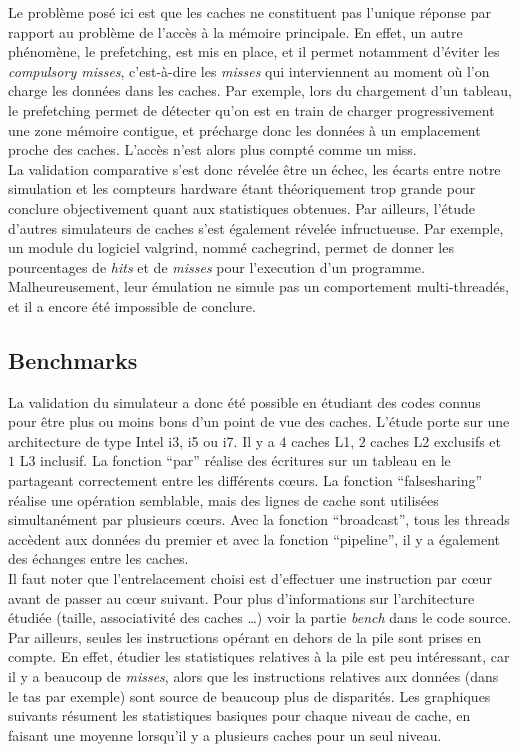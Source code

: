 Le problème posé ici est que les caches ne constituent pas l'unique réponse par rapport au problème de l'accès à la mémoire principale. En effet, un autre phénomène, le prefetching, est mis en place, et il permet notamment d'éviter les \emph{compulsory misses}, c'est-à-dire les \emph{misses} qui interviennent au moment où l'on charge les données dans les caches. Par exemple, lors du chargement d'un tableau, le prefetching permet de détecter qu'on est en train de charger progressivement une zone mémoire contigue, et précharge donc les données à un emplacement proche des caches. L'accès n'est alors plus compté comme un miss. \\

La validation comparative s'est donc révelée être un échec, les écarts entre notre simulation et les compteurs hardware étant théoriquement trop grande pour conclure objectivement quant aux statistiques obtenues. Par ailleurs, l'étude d'autres simulateurs de caches s'est également révelée infructueuse. Par exemple, un module du logiciel valgrind, nommé cachegrind, permet de donner les pourcentages de \emph{hits} et de \emph{misses} pour l'execution d'un programme. Malheureusement, leur émulation ne simule pas un comportement multi-threadés, et il a encore été impossible de conclure.
 
\subsection{Benchmarks}
La validation du simulateur a donc été possible en étudiant des codes connus pour être plus ou moins bons d'un point de vue des caches. L'étude porte sur une architecture de type \textsf{Intel} i3, i5 ou i7. Il y a $4$ caches L1, $2$ caches L2 exclusifs et $1$ L3 inclusif. La fonction ``par'' réalise des écritures sur un tableau en le partageant correctement entre les différents c{\oe}urs. La fonction ``falsesharing'' réalise une opération semblable, mais des lignes de cache sont utilisées simultanément par plusieurs c{\oe}urs. Avec la fonction ``broadcast'', tous les threads accèdent aux données du premier et avec la fonction ``pipeline'', il y a également des échanges entre les caches. \\

Il faut noter que l'entrelacement choisi est d'effectuer une instruction par c{\oe}ur avant de passer au c{\oe}ur suivant. Pour plus d'informations sur l'architecture étudiée (taille, associativité des caches \dots) voir la partie \emph{bench} dans le code source. Par ailleurs, seules les instructions opérant en dehors de la pile sont prises en compte. En effet, étudier les statistiques relatives à la pile est peu intéressant, car il y a beaucoup de \emph{misses}, alors que les instructions relatives aux données (dans le tas par exemple) sont source de beaucoup plus de disparités. Les graphiques suivants résument les statistiques basiques pour chaque niveau de cache, en faisant une moyenne lorsqu'il y a plusieurs caches pour un seul niveau.\\


